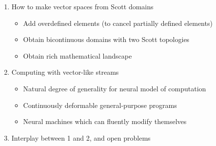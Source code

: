\documentclass{beamer}
\newcommand{\msgray}[1]{{\color{mygray} #1}}
\begin{document}
\begin{frame}

\begin{enumerate}

  \item How to make vector spaces from Scott domains

  \begin{itemize}
      \item Add overdefined elements (to cancel partially defined elements)
      \item Obtain bicontinuous domains with two Scott topologies
      \item Obtain rich mathematical landscape
  \end{itemize}

  \vspace{2ex}

  \item Computing with vector-like streams

  \begin{itemize}
      \item \msgray{Natural degree of generality for neural model of computation}
      \item \msgray{Continuously deformable general-purpose programs}
      \item \msgray{Neural machines which can fluently modify themselves}

  \end{itemize}

  \vspace{2ex}

  \item Interplay between 1 and 2, and open problems

\end{enumerate}

\end{frame}
\end{document}
